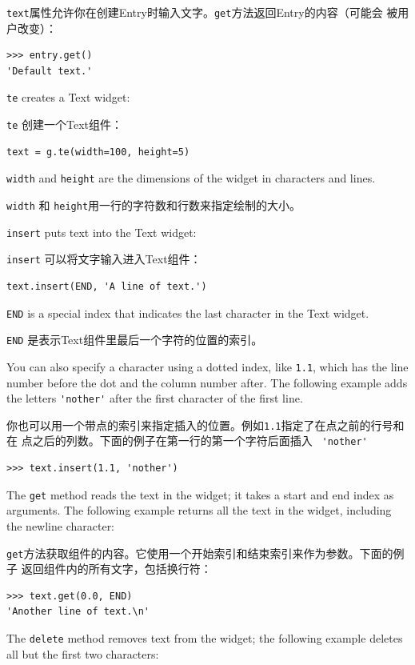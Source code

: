 \documentclass[10pt]{book}
\begin{document}
\begin{CJK}{UTF8}{gbsn}
{\tt text}属性允许你在创建Entry时输入文字。{\tt get}方法返回Entry的内容（可能会
被用户改变）：

\begin{verbatim}
>>> entry.get()
'Default text.'
\end{verbatim}
%
{\tt te} creates a Text widget:

{\tt te} 创建一个Text组件：

\begin{verbatim}
text = g.te(width=100, height=5)
\end{verbatim}
%
{\tt width} and {\tt height} are the dimensions of the
widget in characters and lines.

{\tt width} 和 {\tt height}用一行的字符数和行数来指定绘制的大小。

{\tt insert} puts text into the Text widget:

{\tt insert} 可以将文字输入进入Text组件：

\begin{verbatim}
text.insert(END, 'A line of text.')
\end{verbatim}
%
{\tt END} is a special index that indicates the last character in the
Text widget.

{\tt END} 是表示Text组件里最后一个字符的位置的索引。

You can also specify a character using a dotted index, like {\tt 1.1},
which has the line number before the dot and the column number after.
The following example adds the letters \verb"'nother'" after the first
character of the first line.

你也可以用一个带点的索引来指定插入的位置。例如{\tt 1.1}指定了在点之前的行号和在
点之后的列数。下面的例子在第一行的第一个字符后面插入 \verb" 'nother' "

\begin{verbatim}
>>> text.insert(1.1, 'nother')
\end{verbatim}
%
The {\tt get} method reads the text in the widget; it takes a start
and end index as arguments.  The following example returns all the
text in the widget, including the newline character:

{\tt get}方法获取组件的内容。它使用一个开始索引和结束索引来作为参数。下面的例子
返回组件内的所有文字，包括换行符：

\begin{verbatim}
>>> text.get(0.0, END)
'Another line of text.\n'
\end{verbatim}
%
The {\tt delete} method removes text from the widget;
the following example deletes all but the first two characters:


\end{CJK}
\end{document}
